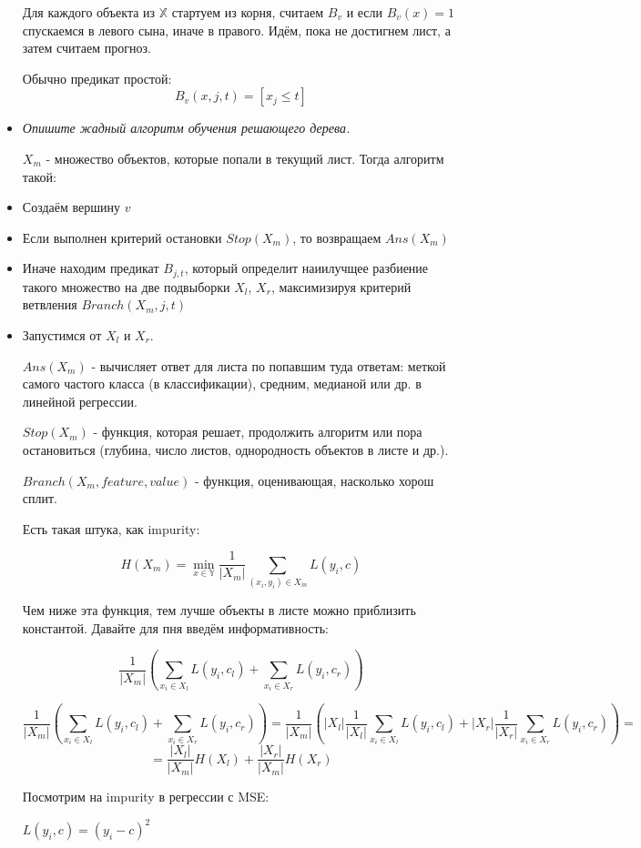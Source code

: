 \documentclass[a4paper]{article}
\begin{document}
\begin{itemize}
Для каждого объекта из $\mathbb{X}$ стартуем из корня, считаем $B_v$ и если $B_v(x) = 1$ спускаемся в левого сына, иначе в правого. Идём, пока не достигнем лист, а затем считаем прогноз.

Обычно предикат простой:
\[ B_v(x, j, t) = [x_j \leq t] \]

\item \textit{ Опишите жадный алгоритм обучения решающего дерева.}

$X_m$ - множество объектов, которые попали в текущий лист. Тогда алгоритм такой:

\item Создаём вершину $v$
\item Если выполнен критерий остановки $Stop(X_m)$, то возвращаем $Ans(X_m)$
\item Иначе находим предикат $B_{j, t}$, который определит наиилучщее разбиение такого множество на две подвыборки $X_l$, $X_r$, максимизируя критерий ветвления $Branch(X_m, j, t)$
\item Запустимся от $X_l$ и $X_r$.


$Ans(X_m)$ - вычисляет ответ для листа по попавшим туда ответам: меткой самого частого класса (в классификации), средним, медианой или др. в линейной регрессии.

$Stop(X_m)$ - функция, которая решает, продолжить алгоритм или пора остановиться (глубина, число листов, однородность объектов в листе и др.).

$Branch(X_m, feature, value)$ - функция, оценивающая, насколько хорош сплит.

Есть такая штука, как impurity:

\[ H(X_m) = \min_{x \in \mathbb{Y}} \frac{1}{|X_m|} \sum_{(x_i, y_i) \in X_m} L(y_i, c) \]

Чем ниже эта функция, тем лучше объекты в листе можно приблизить константой. Давайте для пня введём информативность:

\[ \frac{1}{|X_m|} \left( \sum_{x_i \in X_l} L(y_i, c_l) + \sum_{x_i \in X_r} L(y_i, c_r) \right) \]

\[ \frac{1}{|X_m|} \left( \sum_{x_i \in X_l} L(y_i, c_l) + \sum_{x_i \in X_r} L(y_i, c_r) \right) = 
\frac{1}{|X_m|} \left( |X_l| \frac{1}{|X_l|} \sum_{x_i \in X_l} L(y_i, c_l) + |X_r| \frac{1}{|X_r|} \sum_{x_i \in X_r} L(y_i, c_r) \right) =\]
\[ =  \frac{|X_l|}{|X_m|} H(X_l) + \frac{|X_r|}{|X_m|}H(X_r)\]

Посмотрим на impurity в регрессии с MSE:

$L(y_i, c) = (y_i-c)^2$


\end{itemize}
\end{document}
